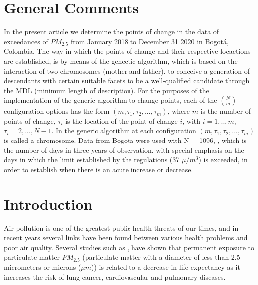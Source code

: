 \documentclass[APA,STIX1COL]{WileyNJD-v2}
\begin{document}
\section{General Comments}\label{sec1}


In the present article we determine the points of change in the data of exceedances of $PM_{2.5}$ from January 2018 to December 31 2020 in Bogot\'a, Colombia. The way in which the points of change and their respective locactions are established, is by means of the genectic algorithm, which is based on the interaction of two chromosomes (mother and father). to conceive a generation of descendants with certain suitable facets to be a well-qualified candidate through the MDL (minimum length of description). For the purposes of the implementation of the generic algorithm to change points, each of the $\binom{N}{m}$ configuration options has the form $(m,\tau_1,\tau_2,...,\tau_m)$, where $m$ is the number of  points of change, $\tau_i$ is the location of the point of change $i$, with $i=1, .. , m$, $\tau_i=2, ..., N-1 $. In the generic algorithm at each configuration $(m, \tau_1, \tau_2, ..., \tau_m)$ is called a chromosome. Data from Bogota were used with N = 1096, , which is the number of days in three years of observation.  with special emphasis on the days in which the limit established by the regulations (37 $\mu/m^3$) is exceeded, in order to establish when there is an acute increase or decrease.  


\section{Introduction}\label{sec2}

Air pollution is one of the greatest public health threats of our times, and in recent years several links have been found between various health problems and poor air quality. 
Several studies such as \cite{Janssen}, have shown that permanent exposure to particulate matter $PM_{2.5}$ (particulate matter with a diameter of less than 2.5 micrometers or microns ($\mu m$)) is related to a decrease in life expectancy as it increases the risk of lung cancer, cardiovascular and pulmonary diseases.\\
\end{document}
